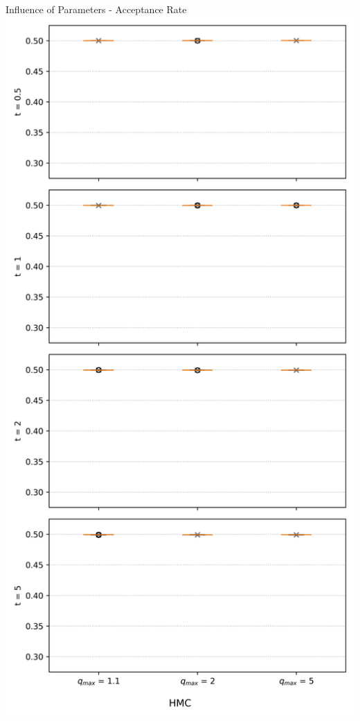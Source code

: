 \documentclass[]{beamer}
\begin{document}
\begin{frame}{Influence of Parameters - Acceptance Rate}
    \includegraphics[scale=0.25]{figs/results/params/acceptance_rates_hmc.png}
  \end{frame}
\end{document}
